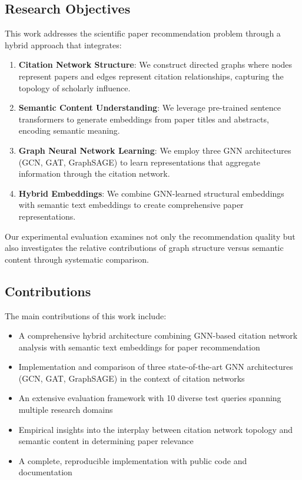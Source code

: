 \documentclass[pdflatex,sn-mathphys-num]{sn-jnl}
\theoremstyle{thmstyleone}%
\theoremstyle{thmstyletwo}%
\theoremstyle{thmstylethree}%
\begin{document}
\subsection{Research Objectives}

This work addresses the scientific paper recommendation problem through a hybrid approach that integrates:

\begin{enumerate}
    \item \textbf{Citation Network Structure}: We construct directed graphs where nodes represent papers and edges represent citation relationships, capturing the topology of scholarly influence.

    \item \textbf{Semantic Content Understanding}: We leverage pre-trained sentence transformers to generate embeddings from paper titles and abstracts, encoding semantic meaning.

    \item \textbf{Graph Neural Network Learning}: We employ three GNN architectures (GCN, GAT, GraphSAGE) to learn representations that aggregate information through the citation network.

    \item \textbf{Hybrid Embeddings}: We combine GNN-learned structural embeddings with semantic text embeddings to create comprehensive paper representations.
\end{enumerate}

Our experimental evaluation examines not only the recommendation quality but also investigates the relative contributions of graph structure versus semantic content through systematic comparison.

\subsection{Contributions}

The main contributions of this work include:

\begin{itemize}
    \item A comprehensive hybrid architecture combining GNN-based citation network analysis with semantic text embeddings for paper recommendation
    \item Implementation and comparison of three state-of-the-art GNN architectures (GCN, GAT, GraphSAGE) in the context of citation networks
    \item An extensive evaluation framework with 10 diverse test queries spanning multiple research domains
    \item Empirical insights into the interplay between citation network topology and semantic content in determining paper relevance
    \item A complete, reproducible implementation with public code and documentation
\end{itemize}
\end{document}

